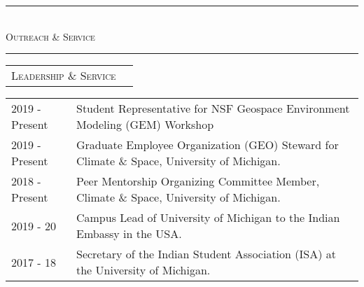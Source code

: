 \documentclass[10pt]{article}
\begin{document}
{{%

\vspace{-0.5em}


\begin{center}
{\noindent\rule[0.5ex]{\linewidth}{0.5pt}\\
\vspace{-0.5em}\large{\textsc{Outreach \& Service}}\\
\vspace{-0.25em}
\noindent\rule[0.5ex]{\linewidth}{0.5pt}}
\end{center}

\vspace{-1em}
\begin{tabular}{p{4.1cm} p{12.65cm}}
\textsc{{Leadership \& Service}} & 
\end{tabular}
\begin{tabular}{p{2.1cm} p{14.65cm}}
2019 - Present & Student Representative for NSF Geospace Environment Modeling (GEM) Workshop\\
2019 - Present & Graduate Employee Organization (GEO) Steward for Climate \& Space, University of Michigan. \\
2018 - Present & Peer Mentorship Organizing Committee Member, Climate \& Space, University of Michigan.\\
2019 - 20 & Campus Lead of University of Michigan to the Indian Embassy in the USA. \\
2017 - 18 & Secretary of the Indian Student Association (ISA) at the University of Michigan. \\
\end{tabular}

}}
\end{document}
